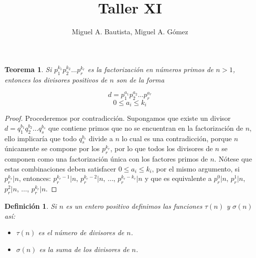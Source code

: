 \documentclass{article}
\newtheorem{theorem}{Teorema}[]
\newtheorem{definition}{Definición}[]
\begin{document}
	\title{Taller XI}
	\author{Miguel A. Bautista, Miguel A. Gómez}
	\maketitle

\begin{theorem}
	Si $p^{k_1}_{1} p^{k_2}_{2} \dots p^{k_r}_{r}$ es la factorización en números primos de $n>1$, entonces los divisores positivos de $n$ son de la forma
	
	$$d = p^{a_1}_{1} p^{a_2}_{2} \dots p^{a_r}_{r}$$
	$$0 \leq a_i \leq k_i$$ 
\end{theorem}
\begin{proof}
	Procederemos por contradicción. Supongamos que existe un divisor $d = q^{b_1}_{1} q^{b_2}_{2} \dots q^{b_s}_{s}$ que contiene primos que no se encuentran en la factorización de $n$, ello implicaría que todo $q^{b_s}_{s}$ divide a $n$ lo cual es una contradicción, porque $n$ únicamente se compone por los $p^{k_r}_{r}$, por lo que todos los divisores de $n$ se componen como una factorización única con los factores primos de $n$. Nótese que estas combinaciones deben satisfacer $0 \leq a_i \leq k_i$, por el mismo argumento, si $p^{k_r}_{r}|n$, entonces: $p^{k_r - 1}_{r}|n$, $p^{k_r - 2}_{r}|n$, $\dots$, $p^{k_r - k_r}_{r}|n$ y que es equivalente a $p^{0}_{r}|n$, $p^{1}_{r}|n$, $p^{2}_{r}|n$, $\dots$, $p^{k_r}_{r}|n$. 
\end{proof}

\begin{definition}
	Si $n$ es un entero positivo definimos las funciones $\tau(n)$ y $\sigma(n)$ así:\cite{rubiano2004}
	\begin{itemize}
		\item $\tau(n)$ es el número de divisores de $n$.
		\item $\sigma(n)$ es la suma de los divisores de $n$.
	\end{itemize}
\end{definition}
\end{document}
